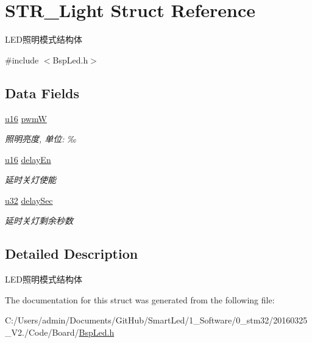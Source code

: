 \hypertarget{struct_s_t_r___light}{\section{\-S\-T\-R\-\_\-\-Light \-Struct \-Reference}
\label{struct_s_t_r___light}
}


\-L\-E\-D照明模式结构体  




{\ttfamily \#include $<$\-Bsp\-Led.\-h$>$}

\subsection*{\-Data \-Fields}
\begin{DoxyCompactItemize}
\item 
\hypertarget{struct_s_t_r___light_a0006ad1f3129f0f007790efcf6fd4dd2}{\hyperlink{group___b_s_p_ga9e6c91d77e24643b888dbd1a1a590054}{u16} \hyperlink{struct_s_t_r___light_a0006ad1f3129f0f007790efcf6fd4dd2}{pwm\-W}}\label{struct_s_t_r___light_a0006ad1f3129f0f007790efcf6fd4dd2}

\begin{DoxyCompactList}\small\item\em 照明亮度, 单位\-: ‰ \end{DoxyCompactList}\item 
\hypertarget{struct_s_t_r___light_aec99ed1ab5c55ca62ed6ae636fb0c20a}{\hyperlink{group___b_s_p_ga9e6c91d77e24643b888dbd1a1a590054}{u16} \hyperlink{struct_s_t_r___light_aec99ed1ab5c55ca62ed6ae636fb0c20a}{delay\-En}}\label{struct_s_t_r___light_aec99ed1ab5c55ca62ed6ae636fb0c20a}

\begin{DoxyCompactList}\small\item\em 延时关灯使能 \end{DoxyCompactList}\item 
\hypertarget{struct_s_t_r___light_ab193458d2d3c1f22bc754aa35ab1ddda}{\hyperlink{group___b_s_p_ga10e94b422ef0c20dcdec20d31a1f5049}{u32} \hyperlink{struct_s_t_r___light_ab193458d2d3c1f22bc754aa35ab1ddda}{delay\-Sec}}\label{struct_s_t_r___light_ab193458d2d3c1f22bc754aa35ab1ddda}

\begin{DoxyCompactList}\small\item\em 延时关灯剩余秒数 \end{DoxyCompactList}\end{DoxyCompactItemize}


\subsection{\-Detailed \-Description}
\-L\-E\-D照明模式结构体 

\-The documentation for this struct was generated from the following file\-:\begin{DoxyCompactItemize}
\item 
\-C\-:/\-Users/admin/\-Documents/\-Git\-Hub/\-Smart\-Led/1\-\_\-\-Software/0\-\_\-stm32/20160325\-\_\-\-V2./\-Code/\-Board/\hyperlink{_bsp_led_8h}{\-Bsp\-Led.\-h}\end{DoxyCompactItemize}
